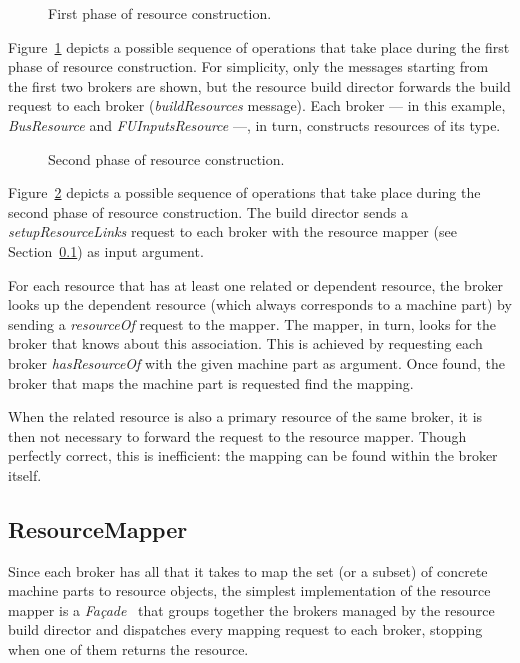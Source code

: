 \documentclass[a4paper,twoside]{tce}
\begin{document}
\begin{figure}[tb]
\centerline{}
\caption{First phase of resource construction.}
  \label{fig:resource-build1}
\end{figure}
%
Figure~\ref{fig:resource-build1} depicts a possible sequence of operations
that take place during the first phase of resource construction. For
simplicity, only the messages starting from the first two brokers are shown,
but the resource build director forwards the build request to each broker
(\emph{buildResources} message). Each broker --- in this example,
\emph{BusResource} and \emph{FUInputsResource} ---, in turn, constructs
resources of its type.

\begin{figure}[tb]
\centerline{}
\caption{Second phase of resource construction.}
  \label{fig:resource-build2}
\end{figure}
%
Figure~\ref{fig:resource-build2} depicts a possible sequence of operations
that take place during the second phase of resource construction. The build
director sends a \emph{setupResourceLinks} request to each broker with the
resource mapper (see Section~\ref{ssec:ResourceMapper-imp}) as input
argument.

For each resource that has at least one related or dependent resource, the
broker looks up the dependent resource (which always corresponds to a
machine part) by sending a \emph{resourceOf} request to the mapper. The
mapper, in turn, looks for the broker that knows about this association.
This is achieved by requesting each broker \emph{hasResourceOf} with the
given machine part as argument. Once found, the broker that maps the machine
part is requested find the mapping.

When the related resource is also a primary resource of the same broker, it
is then not necessary to forward the request to the resource mapper. Though
perfectly correct, this is inefficient: the mapping can be found within the
broker itself.

\subsection{ResourceMapper}
\label{ssec:ResourceMapper-imp}

Since each broker has all that it takes to map the set (or a subset) of
concrete machine parts to resource objects, the simplest implementation of
the resource mapper is a \emph{Façade}~\cite{DesignPatterns} that groups
together the brokers managed by the resource build director and dispatches
every mapping request to each broker, stopping when one of them returns the
resource.
\end{document}
